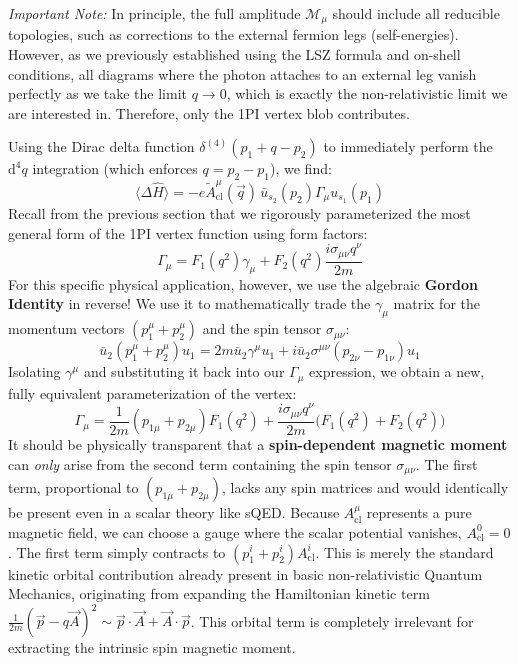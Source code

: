 
\textit{Important Note:} In principle, the full amplitude $\mathcal{M}_\mu$ should include all reducible topologies, such as corrections to the external fermion legs (self-energies). However, as we previously established using the LSZ formula and on-shell conditions, all diagrams where the photon attaches to an external leg vanish perfectly as we take the limit $q \to 0$, which is exactly the non-relativistic limit we are interested in. Therefore, only the 1PI vertex blob contributes.

Using the Dirac delta function $\delta^{(4)}(p_1 + q - p_2)$ to immediately perform the $\mathrm{d}^4 q$ integration (which enforces $q = p_2 - p_1$), we find:
\[
    \langle \Delta \hat{H} \rangle = -e \tilde{A}^\mu_{\text{cl}}(\vec{q}) \, \bar{u}_{s_2}(p_2) \Gamma_\mu u_{s_1}(p_1)
\]
Recall from the previous section that we rigorously parameterized the most general form of the 1PI vertex function using form factors:
\[
    \Gamma_\mu = F_1(q^2) \gamma_\mu + F_2(q^2) \frac{i\sigma_{\mu\nu} q^\nu}{2m}
\]
For this specific physical application, however, we use the algebraic \textbf{Gordon Identity} in reverse! We use it to mathematically trade the $\gamma_\mu$ matrix for the momentum vectors $(p_1^\mu + p_2^\mu)$ and the spin tensor $\sigma_{\mu\nu}$:
\[
    \bar{u}_2 (p_1^\mu + p_2^\mu) u_1 = 2m \bar{u}_2 \gamma^\mu u_1 + i \bar{u}_2 \sigma^{\mu\nu} (p_{2\nu} - p_{1\nu}) u_1
\]
Isolating $\gamma^\mu$ and substituting it back into our $\Gamma_\mu$ expression, we obtain a new, fully equivalent parameterization of the vertex:
\[
    \Gamma_\mu = \frac{1}{2m}(p_{1\mu} + p_{2\mu}) F_1(q^2) + \frac{i\sigma_{\mu\nu} q^\nu}{2m} \big( F_1(q^2) + F_2(q^2) \big)
\]
It should be physically transparent that a \textbf{spin-dependent magnetic moment} can \textit{only} arise from the second term containing the spin tensor $\sigma_{\mu\nu}$. The first term, proportional to $(p_{1\mu} + p_{2\mu})$, lacks any spin matrices and would identically be present even in a scalar theory like sQED.
Because $A^\mu_{\text{cl}}$ represents a pure magnetic field, we can choose a gauge where the scalar potential vanishes, $A^0_{\text{cl}} = 0$. The first term simply contracts to $(p_1^i + p_2^i)A^i_{\text{cl}}$. This is merely the standard kinetic orbital contribution already present in basic non-relativistic Quantum Mechanics, originating from expanding the Hamiltonian kinetic term $\frac{1}{2m}(\vec{p} - q\vec{A})^2 \sim \vec{p} \cdot \vec{A} + \vec{A} \cdot \vec{p}$. This orbital term is completely irrelevant for extracting the intrinsic spin magnetic moment.

